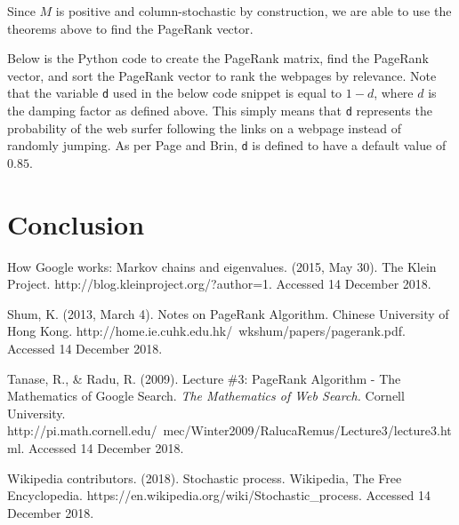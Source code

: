\documentclass[11pt]{article}
\theoremstyle{definition}
\begin{document}
Since $M$ is positive and column-stochastic by construction, we are able to use the theorems above to find the PageRank vector.

Below is the Python code to create the PageRank matrix, find the PageRank vector, and sort the PageRank vector to rank the webpages by relevance.
Note that the variable \texttt{d} used in the below code snippet is equal to $1-d$, where $d$ is the damping factor as defined above.
This simply means that \texttt{d} represents the probability of the web surfer following the links on a webpage instead of randomly jumping.
As per Page and Brin, \texttt{d} is defined to have a default value of $0.85$.




\section{Conclusion}



\begin{thebibliography}{9}
\bibitem{}
How Google works: Markov chains and eigenvalues. (2015, May 30). The Klein Project. http://blog.kleinproject.org/?author=1. Accessed 14 December 2018.

\bibitem{}
Shum, K. (2013, March 4). Notes on PageRank Algorithm. Chinese University of Hong Kong. http://home.ie.cuhk.edu.hk/~wkshum/papers/pagerank.pdf. Accessed 14 December 2018.

\bibitem{}
Tanase, R., \& Radu, R. (2009). Lecture \#3: PageRank Algorithm - The Mathematics of Google Search.
\textit{The Mathematics of Web Search.} Cornell University. 
http://pi.math.cornell.edu/~mec/Winter2009/RalucaRemus/Lecture3/lecture3.html. Accessed 14 December 2018.

\bibitem{}
Wikipedia contributors. (2018). Stochastic process. Wikipedia, The Free Encyclopedia. https://en.wikipedia.org/wiki/Stochastic\_process. Accessed 14 December 2018.

\end{thebibliography}
\end{document}

